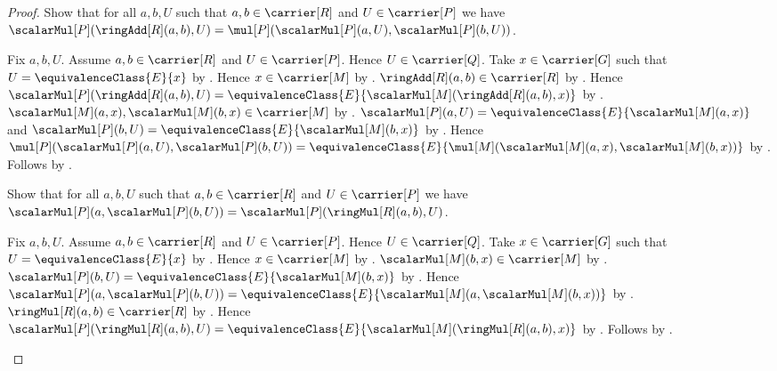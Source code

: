 \begin{proof}
    Show that for all $a,b,U$ such that $a,b\in\carrier[R]$ and
        $U\in\carrier[P]$ we have
        $\scalarMul[P](\ringAdd[R](a,b),U)
            =\mul[P](\scalarMul[P](a,U),\scalarMul[P](b,U))$.
    \begin{subproof}
        Fix $a,b,U$.
        Assume $a,b\in\carrier[R]$ and $U\in\carrier[P]$.
        Hence $U\in\carrier[Q]$.
        Take $x\in\carrier[G]$ such that
            $U=\equivalenceClass{E}{x}$ by
            .
        Hence $x\in\carrier[M]$ by
            .
        $\ringAdd[R](a,b)\in\carrier[R]$ by .
        Hence
            $\scalarMul[P](\ringAdd[R](a,b),U)
                =\equivalenceClass{E}{
                    \scalarMul[M](\ringAdd[R](a,b),x)}$ by
            .
        $\scalarMul[M](a,x),\scalarMul[M](b,x)\in\carrier[M]$ by
            .
        $\scalarMul[P](a,U)=
            \equivalenceClass{E}{\scalarMul[M](a,x)}$ and
            $\scalarMul[P](b,U)=
            \equivalenceClass{E}{\scalarMul[M](b,x)}$ by
            .
        Hence
            $\mul[P](\scalarMul[P](a,U),\scalarMul[P](b,U))
                =\equivalenceClass{E}{
                    \mul[M](\scalarMul[M](a,x),
                        \scalarMul[M](b,x))}$ by
            .
        Follows by .
    \end{subproof}

    Show that for all $a,b,U$ such that $a,b\in\carrier[R]$ and
        $U\in\carrier[P]$ we have
        $\scalarMul[P](a,\scalarMul[P](b,U))
            =\scalarMul[P](\ringMul[R](a,b),U)$.
    \begin{subproof}
        Fix $a,b,U$.
        Assume $a,b\in\carrier[R]$ and $U\in\carrier[P]$.
        Hence $U\in\carrier[Q]$.
        Take $x\in\carrier[G]$ such that
            $U=\equivalenceClass{E}{x}$ by
            .
        Hence $x\in\carrier[M]$ by
            .
        $\scalarMul[M](b,x)\in\carrier[M]$ by
            .
        $\scalarMul[P](b,U)=
            \equivalenceClass{E}{\scalarMul[M](b,x)}$ by
            .
        Hence
            $\scalarMul[P](a,\scalarMul[P](b,U))
                =\equivalenceClass{E}{
                    \scalarMul[M](a,\scalarMul[M](b,x))}$ by
            .
        $\ringMul[R](a,b)\in\carrier[R]$ by .
        Hence
            $\scalarMul[P](\ringMul[R](a,b),U)
                =\equivalenceClass{E}{
                    \scalarMul[M](\ringMul[R](a,b),x)}$ by
            .
        Follows by .
    \end{subproof}


\end{proof}

